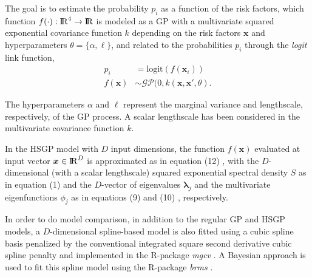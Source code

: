 \documentclass[onecolumn,a4paper,11pt]{article}
\begin{document}
\noindent The goal is to estimate the probability $p_i$ as a function of the risk factors, which function $f(\cdot):{\rm I\!R}^{4} \to {\rm I\!R}$ is modeled as a GP with a multivariate squared exponential covariance function $k$ depending on the risk factors $\bm{x}$ and hyperparameters $\theta=\{\alpha,\ell\}$, and related to the probabilities $p_i$ through the {\it logit} link function,
%
\begin{align*} \label{ch5_eq_gpprior_gay}
p_i &= \mathrm{logit}(f(\bm{x}_i)) \nonumber \\
f(\bm{x}) &\sim \mathcal{GP}(0, k(\bm{x},\bm{x}', \theta).
\end{align*}

\noindent The hyperparameters $\alpha$ and $\ell$ represent the marginal variance and lengthscale, respectively, of the GP process. A scalar lengthscale has been considered in the multivariate covariance function $k$.

In the HSGP model with $D$ input dimensions, the function $f(\bm{x})$ evaluated at input vector $\bm{x} \in {\rm I\!R}^D$ is approximated as in equation (12)%
, with the $D$-dimensional (with a scalar lengthscale) squared exponential spectral density $S$ as in equation (1) %
and the $D$-vector of eigenvalues $\bm{\lambda}_j$ and the multivariate eigenfunctions $\phi_j$ as in equations (9) %
and (10)%
, respectively.


In order to do model comparison, in addition to the regular GP and HSGP models, a $D$-dimensional spline-based model is also fitted using a cubic spline basis penalized by the conventional integrated square second derivative cubic spline penalty \citep{wood2017generalized} and implemented in the R-package \textit{mgcv} \citep{wood2011mgcv}. A Bayesian approach is used to fit this spline model using the R-package \textit{brms} \citep{burkner2017brms}.
\end{document}
